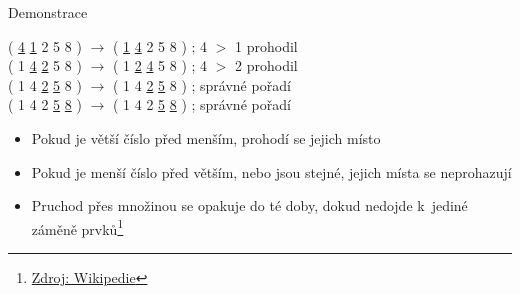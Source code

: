 \documentclass[11pt]{beamer}
\begin{document}
\begin{frame}{Demonstrace}
\begin{center}
( \underline{4} \underline{1} 2 5 8 ) \(\rightarrow\) ( \underline{1} \underline{4} 2 5 8 ) ; 4 $>$ 1 prohodil\\

( 1 \underline{4} \underline{2} 5 8 ) \(\rightarrow\) ( 1 \underline{2} \underline{4} 5 8 ) ; 4 $>$ 2 prohodil\\

( 1 4 \underline{2} \underline{5} 8 ) \(\rightarrow\) ( 1 4 \underline{2} \underline{5} 8 ) ; správné pořadí\\

( 1 4 2 \underline{5} \underline{8} )  \(\rightarrow\) ( 1 4 2 \underline{5} \underline{8} ) ; správné pořadí\\
\end{center}

\begin{itemize}
    \item[\(\Rightarrow\)]<1-> Pokud je větší číslo před menším, prohodí se jejich místo
    \item[\(\Rightarrow\)]<2-> Pokud je menší číslo před větším, nebo jsou stejné, jejich místa se neprohazují
    \item[\(\Rightarrow\)]<3-> Pruchod přes množinou se opakuje do té doby, dokud nedojde k~jediné záměně prvků\footnote{\tiny\href{https://en.wikipedia.org/wiki/Bubble_sort}{Zdroj: Wikipedie}}
\end{itemize}
\end{frame}
\end{document}
